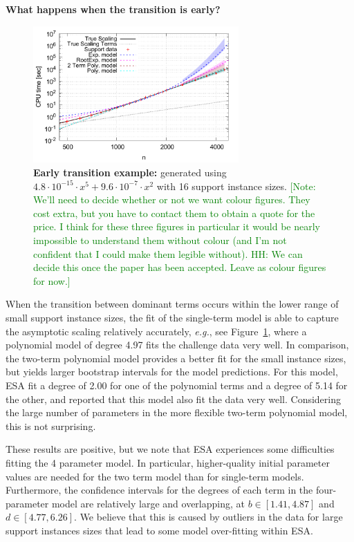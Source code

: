 \documentclass[aic]{iosart2x}
\newcommand{\eg}{\emph{e.g.}}
\newcommand{\note}[1]{\textcolor{green}{[Note: #1]}}
\begin{document}
\textbf{What happens when the transition is early?}
\begin{figure}[t]
\centering
\includegraphics[width=0.7\textwidth]{fittedModels-2-5-14-16s.pdf}
\caption{\textbf{Early transition example:} generated using $4.8\cdot 10^{-15} \cdot x^5 + 9.6\cdot 10^{-7} \cdot x^2$ with 16 support instance sizes. \note{We'll need to decide whether or not we want colour figures. They cost extra, but you have to contact them to obtain a quote for the price. I think for these three figures in particular it would be nearly impossible to understand them without colour (and I'm not confident that I could make them legible without). HH: We can decide this once the paper has been accepted. Leave as colour figures for now.}}
\label{fig:AA-competing-2-5-14-16s}
\end{figure}
When the transition between dominant terms occurs within the lower range of small support instance sizes, the fit of the single-term model is able to capture the asymptotic scaling relatively accurately, \eg{}, see Figure~\ref{fig:AA-competing-2-5-14-16s}, where a polynomial model of degree 4.97 fits the challenge data very well. In comparison, the two-term polynomial model provides a better fit for the small instance sizes, but yields larger bootstrap intervals for the model predictions. For this model, ESA fit a degree of 2.00 for one of the polynomial terms and a degree of 5.14 for the other, and reported that this model also fit the data very well. 
Considering the large number of parameters in the more flexible two-term polynomial model, this is not surprising.

These results are positive, but we note that ESA experiences some difficulties fitting the 4 parameter model. 
In particular, higher-quality initial parameter values are needed for the two term model than for single-term models. Furthermore, the confidence intervals for the degrees of each term in the four-parameter model are relatively large and overlapping, at $b \in [1.41,4.87]$ and $d \in [4.77,6.26]$. 
We believe that this is caused by outliers in the data for large support instances sizes that lead to some model over-fitting within ESA.
\end{document}
